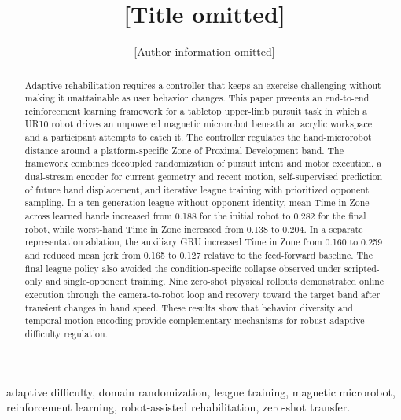 \documentclass[letterpaper,journal]{IEEEtran}
\begin{document}
\title{[Title omitted]}
\author{[Author information omitted]}
\maketitle
\begin{abstract}
Adaptive rehabilitation requires a controller that keeps an exercise challenging without making it unattainable as user behavior changes. This paper presents an end-to-end reinforcement learning framework for a tabletop upper-limb pursuit task in which a UR10 robot drives an unpowered magnetic microrobot beneath an acrylic workspace and a participant attempts to catch it. The controller regulates the hand-microrobot distance around a platform-specific Zone of Proximal Development band. The framework combines decoupled randomization of pursuit intent and motor execution, a dual-stream encoder for current geometry and recent motion, self-supervised prediction of future hand displacement, and iterative league training with prioritized opponent sampling. In a ten-generation league without opponent identity, mean Time in Zone across learned hands increased from 0.188 for the initial robot to 0.282 for the final robot, while worst-hand Time in Zone increased from 0.138 to 0.204. In a separate representation ablation, the auxiliary GRU increased Time in Zone from 0.160 to 0.259 and reduced mean jerk from 0.165 to 0.127 relative to the feed-forward baseline. The final league policy also avoided the condition-specific collapse observed under scripted-only and single-opponent training. Nine zero-shot physical rollouts demonstrated online execution through the camera-to-robot loop and recovery toward the target band after transient changes in hand speed. These results show that behavior diversity and temporal motion encoding provide complementary mechanisms for robust adaptive difficulty regulation.
\end{abstract}
\begin{IEEEkeywords}
adaptive difficulty, domain randomization, league training, magnetic microrobot, reinforcement learning, robot-assisted rehabilitation, zero-shot transfer.
\end{IEEEkeywords}
\end{document}
